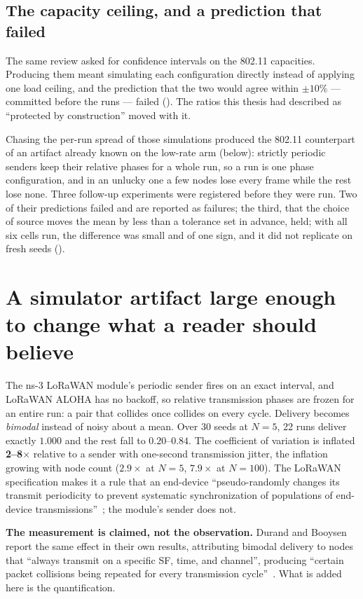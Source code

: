 \subsection{The capacity ceiling, and a prediction that failed}

The same review asked for confidence intervals on the 802.11 capacities. Producing them meant
simulating each configuration directly instead of applying one load ceiling, and the prediction
that the two would agree within $\pm 10\%$ --- committed before the runs --- failed
(). The ratios this thesis had described as ``protected by construction''
moved with it.

Chasing the per-run spread of those simulations produced the 802.11 counterpart of an artifact
already known on the low-rate arm (below): strictly periodic senders keep their relative phases
for a whole run, so a run is one phase configuration, and in an unlucky one a few nodes lose
every frame while the rest lose none. Three follow-up experiments were registered before they
were run. Two of their predictions failed and are reported as failures; the third, that the
choice of source moves the mean by less than a tolerance set in advance, held; with all six
cells run, the difference was small and of one sign, and it did not replicate on fresh seeds
().

\section{A simulator artifact large enough to change what a reader should believe}

The ns-3 LoRaWAN module's periodic sender fires on an exact interval, and LoRaWAN ALOHA has no
backoff, so relative transmission phases are frozen for an entire run: a pair that collides once
collides on every cycle. Delivery becomes \emph{bimodal} instead of noisy about a mean. Over 30
seeds at $N{=}5$, 22 runs deliver exactly $1.000$ and the rest fall to $0.20$--$0.84$. The
coefficient of variation is inflated \textbf{2--8$\times$} relative to a sender with one-second
transmission jitter, the inflation growing with node count ($2.9\times$ at $N{=}5$, $7.9\times$
at $N{=}100$). The LoRaWAN specification makes it a rule that an end-device ``pseudo-randomly
changes its transmit periodicity to prevent systematic synchronization of populations of
end-device transmissions''~\cite{lorawan_ts001}; the module's sender does not.

\textbf{The measurement is claimed, not the observation.} Durand and Booysen report the same
effect in their own results, attributing bimodal delivery to nodes that ``always transmit on a
specific SF, time, and channel'', producing ``certain packet collisions being repeated for every
transmission cycle''~\cite{durand2025loramesh}. What is added here is the quantification.

